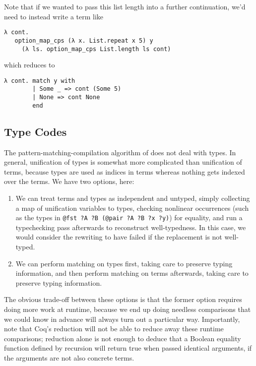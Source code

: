 Note that if we wanted to pass this list length into a further continuation, we'd need to instead write a term like
\begin{verbatim}
λ cont.
   option_map_cps (λ x. List.repeat x 5) y
     (λ ls. option_map_cps List.length ls cont)
\end{verbatim}
\noindent
which reduces to
\begin{verbatim}
λ cont. match y with
        | Some _ => cont (Some 5)
        | None => cont None
        end
\end{verbatim}

\subsection{Type Codes}\label{sec:rewriting-more:prereduction:type-codes}
The pattern-matching-compilation algorithm of \textcite{Aehlig} does not deal with types.
In general, unification of types is somewhat more complicated than unification of terms, because types are used as indices in terms whereas nothing gets indexed over the terms.
We have two options, here:
\begin{enumerate}
\item
  We can treat terms and types as independent and untyped, simply collecting a map of unification variables to types, checking nonlinear occurrences (such as the types in \texttt{@fst ?A ?B (@pair ?A ?B ?x ?y)}) for equality, and run a typechecking pass afterwards to reconstruct well-typedness.
  In this case, we would consider the rewriting to have failed if the replacement is not well-typed.
\item
  We can perform matching on types first, taking care to preserve typing information, and then perform matching on terms afterwards, taking care to preserve typing information.
\end{enumerate}

The obvious trade-off between these options is that the former option requires doing more work at runtime, because we end up doing needless comparisons that we could know in advance will always turn out a particular way.
Importantly, note that Coq's reduction will not be able to reduce away these runtime comparisons; reduction alone is not enough to deduce that a Boolean equality function defined by recursion will return true when passed identical arguments, if the arguments are not also concrete terms.
%
%

